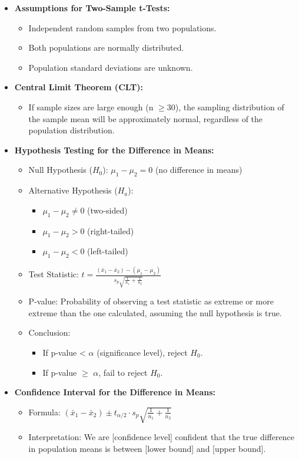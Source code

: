\documentclass{article}
\begin{document}
\begin{multicols}{2}
\begin{itemize}
\item \textbf{Assumptions for Two-Sample t-Tests:}
    \begin{itemize}
        \item Independent random samples from two populations.
        \item Both populations are normally distributed.
        \item Population standard deviations are unknown.
    \end{itemize}
\item \textbf{Central Limit Theorem (CLT): }
    \begin{itemize}
        \item If sample sizes are large enough (n $\ge 30$), the sampling distribution of the sample mean will be approximately normal, regardless of the population distribution.
    \end{itemize}
\item \textbf{Hypothesis Testing for the Difference in Means:}
    \begin{itemize}
        \item Null Hypothesis ($H_0$): $\mu_1 - \mu_2 = 0$ (no difference in means)
        \item Alternative Hypothesis ($H_a$): 
            \begin{itemize}
                \item $\mu_1 - \mu_2 \ne 0$ (two-sided)
                \item $\mu_1 - \mu_2 > 0$ (right-tailed)
                \item $\mu_1 - \mu_2 < 0$ (left-tailed)
            \end{itemize}
        \item Test Statistic: $t = \frac{(\bar{x}_1 - \bar{x}_2) - (\mu_1 - \mu_2)}{s_p \sqrt{\frac{1}{n_1} + \frac{1}{n_2}}}$
        \item P-value: Probability of observing a test statistic as extreme or more extreme than the one calculated, assuming the null hypothesis is true.
        \item Conclusion:
            \begin{itemize}
                \item If p-value < $\alpha$ (significance level), reject $H_0$.
                \item If p-value $\ge$ $\alpha$, fail to reject $H_0$.
            \end{itemize}
    \end{itemize}
\item \textbf{Confidence Interval for the Difference in Means:}
    \begin{itemize}
        \item Formula: $(\bar{x}_1 - \bar{x}_2) \pm t_{\alpha/2} \cdot s_p \sqrt{\frac{1}{n_1} + \frac{1}{n_2}}$
        \item Interpretation: We are [confidence level] confident that the true difference in population means is between [lower bound] and [upper bound].
    \end{itemize}
\end{itemize}


\end{multicols}
\end{document}

